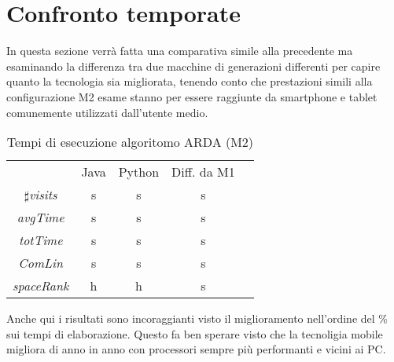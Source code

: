 \section{Confronto temporate}
In questa sezione verr\`a fatta una comparativa simile alla precedente ma esaminando
la differenza tra due macchine di generazioni differenti per capire quanto la tecnologia
sia migliorata, tenendo conto che prestazioni simili alla configurazione M2 esame stanno
per essere raggiunte da smartphone e tablet comunemente utilizzati dall'utente medio.
\begin{table}[]
\centering
\caption{Tempi di esecuzione algoritomo ARDA (M2)}
\label{bcmrk_ARDA}
\begin{tabular}{lllll}
\hline
\multicolumn{1}{|c|}{}                        & \multicolumn{1}{|c|}{Java} & \multicolumn{1}{|c|}{Python}  & \multicolumn{1}{|c|}{Diff. da M1} \\
\multicolumn{1}{|c|}{$\sharp$\textit{visits}} & \multicolumn{1}{|c|}{ s}   & \multicolumn{1}{|c|}{ s} & \multicolumn{1}{|c|}{ s}             \\
\multicolumn{1}{|c|}{\textit{avgTime}}        & \multicolumn{1}{|c|}{ s}   & \multicolumn{1}{|c|}{ s} & \multicolumn{1}{|c|}{ s}             \\
\multicolumn{1}{|c|}{\textit{totTime}}        & \multicolumn{1}{|c|}{ s}   & \multicolumn{1}{|c|}{ s} & \multicolumn{1}{|c|}{ s}             \\
\multicolumn{1}{|c|}{\textit{ComLin}}         & \multicolumn{1}{|c|}{ s}   & \multicolumn{1}{|c|}{ s} & \multicolumn{1}{|c|}{ s}             \\
\multicolumn{1}{|c|}{\textit{spaceRank}}      & \multicolumn{1}{|c|}{ h}   & \multicolumn{1}{|c|}{ h}    & \multicolumn{1}{|c|}{ s}\\
\hline
\end{tabular}
\end{table}
Anche qui i risultati sono incoraggianti visto il miglioramento nell'ordine del
\% sui tempi di elaborazione. Questo fa ben sperare visto che la tecnoligia mobile
migliora di anno in anno con processori sempre pi\`u performanti e vicini ai PC.
